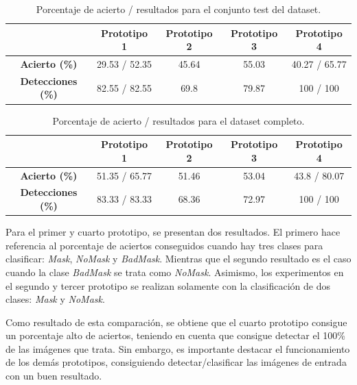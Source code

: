 \begin{table}[h!]
	\begin{center}
		\begin{tabular}{ |c|c|c|c|c| } 
			\hline
			& \textbf{Prototipo 1} & \textbf{Prototipo 2} & \textbf{Prototipo 3} & \textbf{Prototipo 4} \\
			\hline
			\textbf{Acierto (\%)} & 29.53 / 52.35 & 45.64 & 55.03 & 40.27 / 65.77 \\
			\hline
			\textbf{Detecciones (\%)} & 82.55 / 82.55 & 69.8  & 79.87 & 100 / 100 \\
			\hline
		\end{tabular}
		\caption{Porcentaje de acierto / resultados para el conjunto test del dataset.}
		\label{tab:test}
	\end{center}
\end{table}

\begin{table}[h!]
	\begin{center}
		\begin{tabular}{ |c|c|c|c|c| } 
			\hline
			& \textbf{Prototipo 1} & \textbf{Prototipo 2} & \textbf{Prototipo 3} & \textbf{Prototipo 4} \\
			\hline
			\textbf{Acierto (\%)} & 51.35 / 65.77 & 51.46 & 53.04 & 43.8 / 80.07 \\
			\hline
			\textbf{Detecciones (\%)} & 83.33 / 83.33 & 68.36  & 72.97 & 100 / 100 \\
			\hline
		\end{tabular}
		\caption{Porcentaje de acierto / resultados para el dataset completo.}
		\label{tab:dataset}
	\end{center}
\end{table}

Para el primer y cuarto prototipo, se presentan dos resultados. El primero hace referencia al porcentaje de aciertos conseguidos cuando hay tres clases para clasificar: \textit{Mask}, \textit{NoMask} y \textit{BadMask}. Mientras que el segundo resultado es el caso cuando la clase \textit{BadMask} se trata como \textit{NoMask}. Asimismo, los experimentos en el segundo y tercer prototipo se realizan solamente con la clasificación de dos clases: \textit{Mask} y \textit{NoMask}. 

Como resultado de esta comparación, se obtiene que el cuarto prototipo consigue un porcentaje alto de aciertos, teniendo en cuenta que consigue detectar el 100\% de las imágenes que trata. Sin embargo, es importante destacar el funcionamiento de los demás prototipos, consiguiendo detectar/clasificar las imágenes de entrada con un buen resultado.

